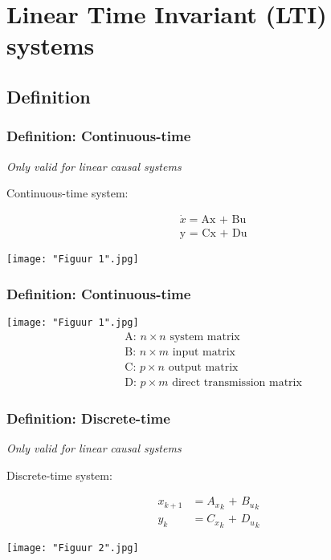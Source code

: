 \section{Linear Time Invariant (LTI) systems}
\subsection{Definition}
\vspace{-2ex}
\begin{frame}
	\frametitle{Definition: Continuous-time}
	\emph{Only valid for \color{red}linear} \emph{causal systems}
	
Continuous-time system:

		\vspace{-2ex}
		\begin{align*}
		&\dot{x} = \text{Ax + Bu}\\
				&\text{y = Cx + Du}
		\end{align*}
		
\texttt{[image: "Figuur 1".jpg]}


\end{frame}

\begin{frame}
	\frametitle{Definition: Continuous-time}
\vspace{0.6cm}

\texttt{[image: "Figuur 1".jpg]}
\begin{align*}
 &\text{A: } n\times n \text{ system matrix}\\
 &\text{B: } n\times m \text{ input matrix}\\
 &\text{C: } p\times n \text{ output matrix}\\
 &\text{D: } p\times m \text{ direct transmission matrix}
\end{align*}
\end{frame}


\begin{frame}
	\frametitle{Definition: Discrete-time}
	\emph{Only valid for \color{red}linear} \emph{causal systems}
	
Discrete-time system:

		\vspace{-2ex}
		\begin{align*}
		x_{k+1} &= {A_x}_k\text{ + } {B_u}_k\\
		y_{k} &= {C_x}_k\text{ + } {D_u}_k
		\end{align*}

\vspace{-0.5cm}
\texttt{[image: "Figuur 2".jpg]}


\end{frame}

